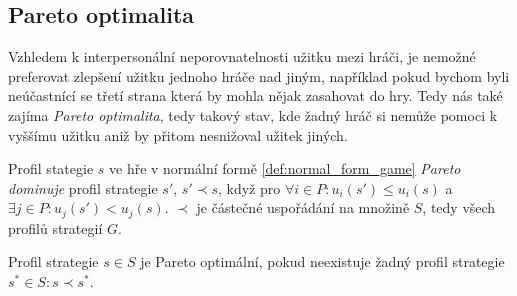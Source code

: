 \subsection{Pareto optimalita}
Vzhledem k interpersonální neporovnatelnosti užitku mezi hráči, je nemožné preferovat zlepšení užitku jednoho hráče nad jiným, například pokud bychom byli neúčastnící se třetí strana která by mohla nějak zasahovat do hry. 
Tedy nás také zajíma \textit{Pareto optimalita}, tedy takový stav, kde žadný hráč si nemůže pomoci k vyššímu užitku aniž by přitom nesnižoval užitek jiných. 
\begin{definition}
\label{def:pareto_dominates}
Profil stategie $s$ ve hře v normální formě \ref{def:normal_form_game} \textit{Pareto dominuje} profil strategie $s'$, $s' \prec s$, když pro $\forall i \in P: u_i(s') \leq u_i(s)$ a $\exists j\in P: u_j(s') < u_j(s)$. 
$\prec$ je částečné uspořádání na množině $S$, tedy všech profilů strategií $G$. 
\end{definition}
\begin{definition}
\label{def:pareto_optimal}
Profil strategie $s \in S$ je Pareto optimální, pokud neexistuje žadný profil strategie $s^* \in S: s \prec s^*$.
\end{definition}
